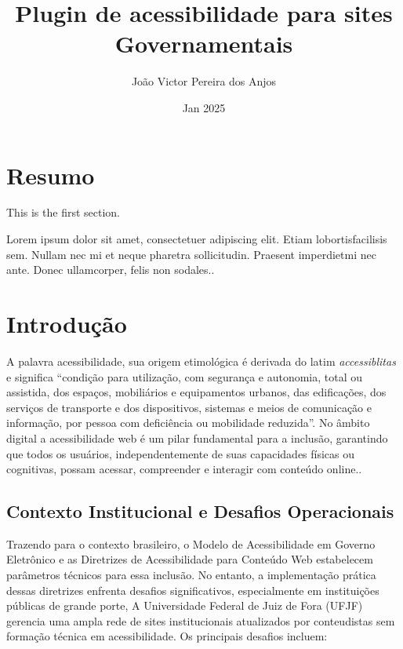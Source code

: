 \documentclass[12pt]{article}
\title{Plugin de acessibilidade para sites Governamentais}
\author{João Victor Pereira dos Anjos}
\date{Jan 2025}
\begin{document}
\maketitle
  
\tableofcontents

\section{Resumo}
   
This is the first section.
      
Lorem  ipsum  dolor  sit  amet,  consectetuer  adipiscing  
elit.   Etiam  lobortisfacilisis sem.  Nullam nec mi et 
neque pharetra sollicitudin.  Praesent imperdietmi nec ante. 
Donec ullamcorper, felis non sodales..

\section{Introdução}

A palavra acessibilidade, sua origem etimológica é derivada do 
latim \textit{accessiblitas} e significa ``condição para utilização, com segurança e autonomia, total ou assistida, dos espaços, mobiliários e equipamentos urbanos, das edificações, dos serviços de transporte e dos dispositivos, sistemas e meios de comunicação e informação, por pessoa com deficiência ou mobilidade reduzida''\cite{Acessibilidade}. No âmbito digital a acessibilidade web é um pilar fundamental para a inclusão, garantindo que todos os usuários, independentemente de suas capacidades físicas ou cognitivas, possam acessar, compreender e interagir com conteúdo online.\cite{wcag21}. 

\subsection{Contexto Institucional e Desafios Operacionais}\label{subsec:contexto}
Trazendo para o contexto brasileiro, o Modelo de Acessibilidade em Governo Eletrônico\cite{emag} e as Diretrizes de Acessibilidade para Conteúdo Web\cite{wcag22} estabelecem parâmetros técnicos para essa inclusão. No entanto, a implementação prática dessas diretrizes enfrenta desafios significativos, especialmente em instituições públicas de grande porte, A Universidade Federal de Juiz de Fora (UFJF) gerencia uma ampla rede de sites institucionais atualizados por conteudistas sem formação técnica em acessibilidade\cite{emag}. Os principais desafios incluem:
\end{document}
